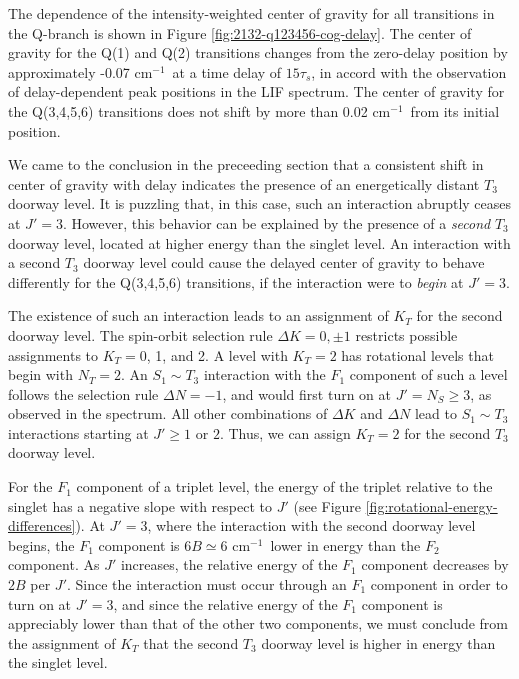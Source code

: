 \documentclass[12pt]{mitthesis}
\newcommand{\rcm}{cm$^{-1}$}
\begin{document}
The dependence of the intensity-weighted center of gravity for all
transitions in the Q-branch is shown in Figure
\ref{fig:2132-q123456-cog-delay}.  The center of gravity for the Q(1)
and Q(2) transitions changes from the zero-delay position by
approximately -0.07 \rcm\ at a time delay of $15\tau_s$, in accord
with the observation of delay-dependent peak positions in the LIF
spectrum.  The center of gravity for the Q(3,4,5,6) transitions does
not shift by more than 0.02 \rcm\ from its initial position.

We came to the conclusion in the preceeding section that a consistent
shift in center of gravity with delay indicates the presence of an
energetically distant $T_3$ doorway level.  It is puzzling that, in
this case, such an interaction abruptly ceases at $J'=3$.  However,
this behavior can be explained by the presence of a \emph{second}
$T_3$ doorway level, located at higher energy than the singlet level.
An interaction with a second $T_3$ doorway level could cause the
delayed center of gravity to behave differently for the Q(3,4,5,6)
transitions, if the interaction were to \emph{begin} at $J'=3$.

The existence of such an interaction leads to an assignment of $K_T$
for the second doorway level.  The spin-orbit selection rule $\Delta K
= 0, \pm 1$ restricts possible assignments to $K_T=$0, 1, and 2.  A
level with $K_T=2$ has rotational levels that begin with $N_T=2$.  An
$S_1 \sim T_3$ interaction with the $F_1$ component of such a level
follows the selection rule $\Delta N = -1$, and would first turn on at
$J'=N_S \geq 3$, as observed in the spectrum.  All other combinations
of $\Delta K$ and $\Delta N$ lead to $S_1 \sim T_3$ interactions
starting at $J' \geq 1$ or $2$.  Thus, we can assign $K_T=2$ for the
second $T_3$ doorway level.

For the $F_1$ component of a triplet level, the energy of the triplet
relative to the singlet has a negative slope with respect to $J'$ (see
Figure \ref{fig:rotational-energy-differences}).  At $J'=3$, where the
interaction with the second doorway level begins, the $F_1$ component
is $6B \simeq 6$ \rcm\ lower in energy than the $F_2$ component.  As
$J'$ increases, the relative energy of the $F_1$ component decreases
by $2B$ per $J'$.  Since the interaction must occur through an $F_1$
component in order to turn on at $J'=3$, and since the relative energy
of the $F_1$ component is appreciably lower than that of the other two
components, we must conclude from the assignment of $K_T$ that the
second $T_3$ doorway level is higher in energy than the singlet level.
\end{document}
